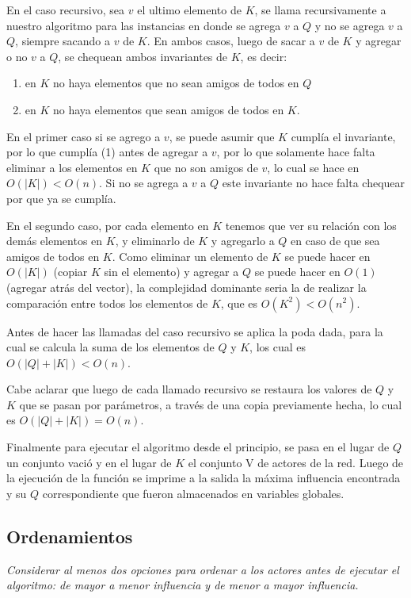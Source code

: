 \documentclass[10pt, a4paper]{article}
\begin{document}
En el caso recursivo, sea $v$ el ultimo elemento de $K$, se llama recursivamente a nuestro algoritmo para las instancias en donde se agrega $v$ a $Q$ y no se agrega $v$ a $Q$, siempre sacando a $v$ de $K$. En ambos casos, luego de sacar a $v$ de $K$ y agregar o no $v$ a $Q$, se chequean ambos invariantes de $K$, es decir: \begin{enumerate}
\item en $K$ no haya elementos que no sean amigos de todos en $Q$ 
\item en $K$ no haya elementos que sean amigos de todos en $K$. 
\end{enumerate}

En el primer caso si se agrego a $v$, se puede asumir que $K$ cumplía el invariante, por lo que cumplía (1) antes de agregar a $v$, por lo que solamente hace falta eliminar a los elementos en $K$ que no son amigos de $v$, lo cual se hace en $O(|K|) < O(n)$. Si no se agrega a $v$ a $Q$ este invariante no hace falta chequear por que ya se cumplía.

En el segundo caso, por cada elemento en $K$ tenemos que ver su relación con los demás elementos en $K$, y eliminarlo de $K$ y agregarlo a $Q$ en caso de que sea amigos de todos en $K$. Como eliminar un elemento de $K$ se puede hacer en $O(|K|)$ (copiar $K$ sin el elemento) y agregar a $Q$ se puede hacer en $O(1)$ (agregar atrás del vector), la complejidad dominante seria la de realizar la comparación entre todos los elementos de $K$, que es $O(K^2) < O(n^2)$.

Antes de hacer las llamadas del caso recursivo se aplica la poda dada, para la cual se calcula la suma de los elementos de $Q$ y $K$, los cual es $O(|Q|+|K|) < O(n)$.

Cabe aclarar que luego de cada llamado recursivo se restaura los valores de $Q$ y $K$ que se pasan por parámetros, a través de una copia previamente hecha, lo cual es $O(|Q|+|K|) = O(n)$.

Finalmente para ejecutar el algoritmo desde el principio, se pasa en el lugar de $Q$ un conjunto vació y en el lugar de $K$ el conjunto V de actores de la red. Luego de la ejecución de la función se imprime a la salida la máxima influencia encontrada y su $Q$ correspondiente que fueron almacenados en variables globales.

\subsection{Ordenamientos}
\emph{Considerar al menos dos opciones para ordenar a los actores antes de ejecutar el algoritmo: de
mayor a menor influencia y de menor a mayor influencia.} \\
\end{document}
